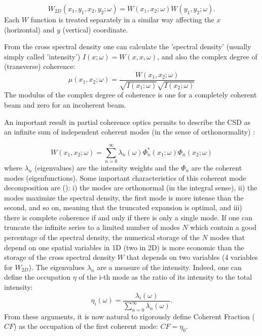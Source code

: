 \documentclass{iucr}              %
\begin{document}
\begin{equation}
W_{2D}(x_1,y_1,x_2,y_2;\omega) = W(x_1,x_2;\omega) W(y_1,y_2;\omega).
\label{eq:CSD_2D}
\end{equation}
Each $W$ function is treated separately in a similar way affecting the $x$ (horizontal) and $y$ (vertical) coordinate.

From the cross spectral density one can calculate the 'spectral density' (usually simply called 'intensity') $I(x;\omega)=W(x,x,\omega)$, and also the complex degree of (transverse) coherence: 
\begin{equation}
\mu(x_1,x_2;\omega) = \frac{W(x_1,x_2;\omega)}{\sqrt{I(x_1;\omega)}\sqrt{I(x_2;\omega)}}
\label{eq:DTC}
\end{equation}
The modulus of the complex degree of coherence is one for a completely coherent beam and zero for an incoherent beam. 

An important result in partial coherence optics permits to describe the CSD as an infinite sum of independent coherent modes (in the sense of orthonormality) :

\begin{equation}
W(x_1,x_2;\omega) = \sum_{n=0}^{\infty} \lambda_n(\omega) \Phi_n^*(x_1;\omega) \Phi_n(x_2;\omega) 
\label{eq:CMD}
\end{equation}
where $\lambda_n$ (eigenvalues) are the intensity weights and the $\Phi_n$ are the coherent modes (eigenfunctions). 
Some important characteristics of this coherent mode decomposition are (\cite{mandel_wolf}): i) the modes are orthonormal (in the integral sense), ii) the modes maximize the spectral density, the first mode is more intense than the second, and so on, meaning that the truncated expansion is optimal, and iii) there is complete coherence if and only if there is only a single mode. If one can truncate the infinite series to a limited number of modes $N$ which contain a good percentage of the spectral density, the numerical storage of the $N$ modes that depend on one spatial variables in 1D (two in 2D) is more economic than the storage of the cross spectral density $W$ that depends on two variables (4 variables for $W_{2D}$). 
The eigenvalues $\lambda_n$ are a measure of the intensity. Indeed, one can define the occupation $\eta$ of the i-th mode as the ratio of its intensity to the total intensity: 
\begin{equation}
\label{eq:occupation}
\eta_i(\omega) = \frac{\lambda_i(\omega)}{\sum_{n=0}^{\infty} \lambda_n(\omega)}.
\end{equation}
From these arguments, it is now natural to rigorously define Coherent Fraction ($CF$) as the occupation of the first coherent mode: $CF=\eta_0$.
\end{document}
